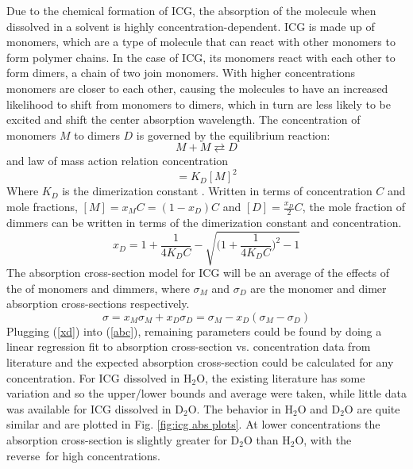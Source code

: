 Due to the chemical formation of ICG, the absorption of the molecule when dissolved in a solvent is highly concentration-dependent. ICG is made up of monomers, which are a type of molecule that can react with other monomers to form polymer chains. In the case of ICG, its monomers react with each other to form dimers, a chain of two join monomers.
With higher concentrations monomers are closer to each other, causing the molecules to have an increased likelihood to shift from monomers to dimers, which in turn are less likely to be excited and shift the center absorption wavelength. The concentration of monomers $M$ to dimers $D$ is governed by the equilibrium reaction:
\begin{equation}
	M+M\rightleftarrows D
\end{equation}
and law of mass action relation concentration
\begin{equation}
	[D] =  K_D[M]^2
\end{equation}
Where $K_D$ is the dimerization constant . Written in terms of concentration $C$ and mole fractions, $[M] = x_MC= (1-x_D)C $ and $[D]=\frac{x_D}{2}C$, the  mole fraction of dimmers can be written in terms of the dimerization constant and concentration.
\begin{equation}
	x_D = 1 + \frac{1}{4K_DC} - \sqrt{\big( 1 + \frac{1}{4K_DC}\big)^2-1}
	\label{xd}
\end{equation}
The absorption cross-section model for ICG\cite{mauerer, philip} will be an average of the effects of the of monomers and dimmers, where $\sigma_M$ and $\sigma_D$ are the monomer and dimer absorption cross-sections respectively.
\begin{equation}
	\sigma = x_M \sigma_M + x_D \sigma_D = \sigma_M - x_D(\sigma_M - \sigma_D)
	\label{abc}
\end{equation}
Plugging (\ref{xd}) into (\ref{abc}), remaining parameters could be found by doing a linear regression fit to absorption cross-section vs. concentration data from literature and the expected absorption cross-section could be calculated for any concentration. For ICG dissolved in H${}_2$O, the existing literature has some variation and so the upper/lower bounds and average were taken, while little data was available for ICG dissolved in D${}_2$O. The behavior in H${}_2$O and D${}_2$O are quite similar and are plotted in Fig. \ref{fig:icg abs plots}. At lower concentrations the absorption cross-section is slightly greater for D${}_2$O than H${}_2$O, with the reverse for high concentrations.
\clearpage

